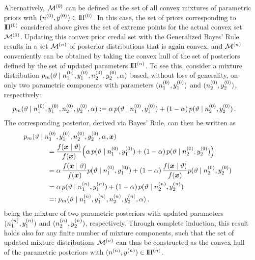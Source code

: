 Alternatively, $\mathcal{M}^{(0)}$ can be defined as the set of all convex mixtures of parametric priors with $(n^{(0)}, y^{(0)}) \in \text{I}\!\Pi^{(0)}$.
In this case, the set of priors corresponding to $\text{I}\!\Pi^{(0)}$ considered above gives the set of extreme points for the actual convex set $\mathcal{M}^{(0)}$.
Updating this convex prior credal set with the Generalized Bayes' Rule results in a set $\mathcal{M}^{(n)}$ of posterior distributions that is again convex,
and $\mathcal{M}^{(n)}$ conveniently can be obtained by taking the convex hull of the set of posteriors
defined by the set of updated parameters $\text{I}\!\Pi^{(n)}$.
%
To see this, consider a mixture distribution $p_m(\vartheta\mid n^{(0)}_1,y^{(0)}_1, n^{(0)}_2,y^{(0)}_2, \alpha)$
based, without loss of generality, on only two parametric components
with parameters $(n^{(0)}_1,y^{(0)}_1)$ and $(n^{(0)}_2,y^{(0)}_2)$, respectively:
\begin{align*}
p_m(\vartheta\mid n^{(0)}_1,y^{(0)}_1, n^{(0)}_2,y^{(0)}_2, \alpha) &:=
   \alpha\,  p(\vartheta\mid n^{(0)}_1,y^{(0)}_1) +
(1-\alpha)\, p(\vartheta\mid n^{(0)}_2,y^{(0)}_2) \,.
\end{align*}
The corresponding posterior, derived via Bayes' Rule, %
can then be written as
\begin{align}
\lefteqn{
p_m(\vartheta\mid \nz_1,\yz_1, \nz_2,\yz_2, \alpha, \x) } \hspace*{8ex} & \nonumber\\
 &= \frac{f(\x\mid\vartheta)}{f(\x)} \Big(
     \alpha\,  p(\vartheta\mid\nz_1,\yz_1) +
  (1-\alpha)\, p(\vartheta\mid\nz_2,\yz_2) \Big) \nonumber\\
 &=  \alpha\,  \frac{f(\x\mid\vartheta)}{f(\x)} p(\vartheta\mid\nz_1,\yz_1) +
  (1-\alpha)\, \frac{f(\x\mid\vartheta)}{f(\x)} p(\vartheta\mid\nz_2,\yz_2) \nonumber\\
 &=  \alpha\,  p(\vartheta\mid\nn_1,\yn_1) +
  (1-\alpha)\, p(\vartheta\mid\nn_2,\yn_2) \nonumber\\
 &=: p_m(\vartheta\mid \nn_1,\yn_1, \nn_2,\yn_2, \alpha)\,,
\label{sec:posteriormixture}
\end{align}
being the mixture of two parametric posteriors
with updated parameters $(n^{(n)}_1,y^{(n)}_1)$ and $(n^{(n)}_2,y^{(n)}_2)$, respectively.
Through complete induction, this result holds also for any finite number of mixture components, such that
the set of updated mixture distributions $\mathcal{M}^{(n)}$ can thus be constructed
as the convex hull of the parametric posteriors %
with $(n^{(n)},y^{(n)}) \in \text{I}\!\Pi^{(n)}$.

